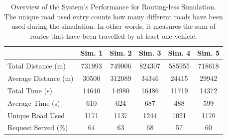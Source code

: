 \begin{table}[h]
	\centering
	\begin{tabular}{ |p{3.7cm}|c|c|c|c|c|}
		\hline
		& Sim. 1 & Sim. 2 & Sim. 3 & Sim. 4 & Sim. 5 \\
		\hline
		Total Distance (m)     &731993& 749006   & 824307 & 585955& 718618 \\
		Average Distance (m)  &30500 & 312089  & 34346 & 24415& 29942\\
		Total Time (s)         &14640& 14980  & 16486 & 11719& 14372\\
		Average Time (s)      & 610& 624   & 687 & 488& 599\\
		Unique Road Used 				&1171&1137&1244&1021& 1170\\
		Request Served  (\%)&64 & 63   & 68 & 57&60 \\
	\end{tabular}
	
	\caption[Overview of the System's Performance for Routing-less Simulation.]{Overview of the System's Performance for Routing-less Simulation. The unique road used entry counts how many different roads have been used during the simulation. In other words, it measures the sum of routes that have been travelled by at least one vehicle. }
	\label{tab:routingless_simu_performance}   
\end{table}
